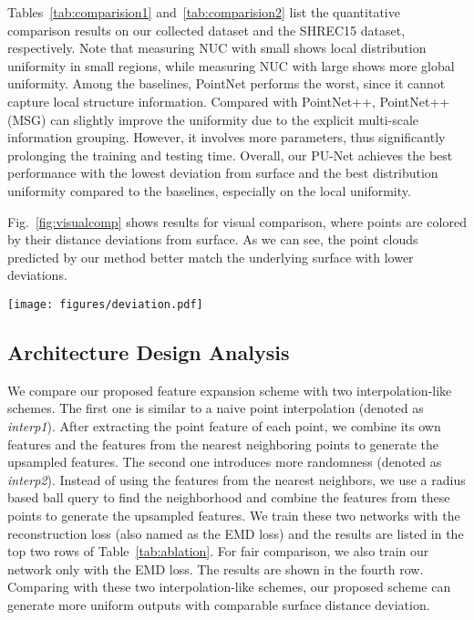 Tables~\ref{tab:comparision1} and~\ref{tab:comparision2} list the quantitative comparison results on our collected dataset and the SHREC15 dataset, respectively.
Note that measuring NUC with small  shows local distribution uniformity in small regions, while measuring NUC with large  shows more global uniformity.
Among the baselines, PointNet performs the worst, since it cannot capture local structure information. 
Compared with PointNet++, PointNet++(MSG) can slightly improve the uniformity due to the explicit multi-scale information grouping.  
However, it involves more parameters, thus significantly prolonging the training and testing time.
Overall, our PU-Net achieves the best performance with the lowest deviation from surface and the best distribution uniformity compared to the baselines, especially on the local uniformity.


Fig.~\ref{fig:visualcomp} shows results for visual comparison, where points are colored by their distance deviations from surface.
As we can see, the point clouds predicted by our method better match the underlying surface with lower deviations.  

\begin{figure*}[t]
	\centering
	\texttt{[image: figures/deviation.pdf]}\vspace{1mm}
	\caption{Visual comparison on samples from our collected dataset (top row) and SHREC (bottom row).
The colors on points (see color map) reveal the surface distance errors, where blue indicates low error and red indicates high error.}
	\label{fig:visualcomp}\vspace{-2mm}
\end{figure*}


\subsection{Architecture Design Analysis}
\label{sec:archtanalysis}

We compare our proposed feature expansion scheme with two interpolation-like schemes.  
The first one is similar to a naive point interpolation (denoted as \emph{interp1}). 
After extracting the point feature of each point, we combine its own features and the features from the nearest neighboring points to generate the upsampled features. 
The second one introduces more randomness (denoted as \emph{interp2}). 
Instead of using the features from the nearest neighbors, we use a radius based ball query to find the neighborhood and combine the features from these points to generate the upsampled features. 
We train these two networks with the reconstruction loss (also named as the EMD loss) and the results are listed in the top two rows of Table~\ref{tab:ablation}.
For fair comparison, we also train our network only with the EMD loss.
The results are shown in the fourth row.  
Comparing with these two interpolation-like schemes, our proposed scheme can generate more uniform outputs with comparable surface distance deviation.


